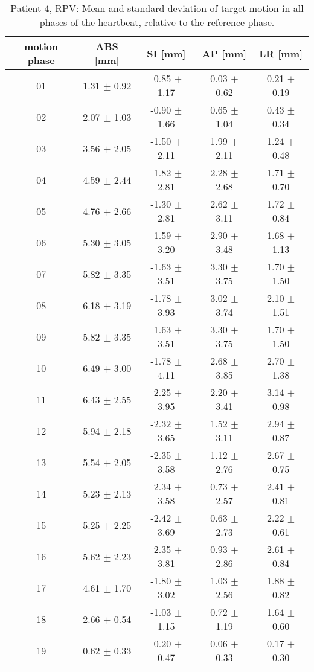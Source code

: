 \begin{table}[htbp]
  \centering
    \tiny
  \caption{Patient 4, RPV: Mean and standard deviation of target motion in all phases of the heartbeat, relative to the reference phase.}
  \begin{tabular}{|c|c|c|c|c|}
    \hline\hline
    motion phase\rule{0pt}{2.6ex}\rule[-1.2ex]{0pt}{0pt} & ABS [mm] & SI [mm] & AP [mm] & LR [mm]\\
    \hline
01& 1.31 $\pm$ 0.92& -0.85 $\pm$ 1.17& 0.03 $\pm$ 0.62& 0.21 $\pm$ 0.19 \\
02& 2.07 $\pm$ 1.03& -0.90 $\pm$ 1.66& 0.65 $\pm$ 1.04& 0.43 $\pm$ 0.34 \\
03& 3.56 $\pm$ 2.05& -1.50 $\pm$ 2.11& 1.99 $\pm$ 2.11& 1.24 $\pm$ 0.48 \\
04& 4.59 $\pm$ 2.44& -1.82 $\pm$ 2.81& 2.28 $\pm$ 2.68& 1.71 $\pm$ 0.70 \\
05& 4.76 $\pm$ 2.66& -1.30 $\pm$ 2.81& 2.62 $\pm$ 3.11& 1.72 $\pm$ 0.84 \\
06& 5.30 $\pm$ 3.05& -1.59 $\pm$ 3.20& 2.90 $\pm$ 3.48& 1.68 $\pm$ 1.13 \\
07& 5.82 $\pm$ 3.35& -1.63 $\pm$ 3.51& 3.30 $\pm$ 3.75& 1.70 $\pm$ 1.50 \\
08& 6.18 $\pm$ 3.19& -1.78 $\pm$ 3.93& 3.02 $\pm$ 3.74& 2.10 $\pm$ 1.51 \\
09& 5.82 $\pm$ 3.35& -1.63 $\pm$ 3.51& 3.30 $\pm$ 3.75& 1.70 $\pm$ 1.50 \\
10& 6.49 $\pm$ 3.00& -1.78 $\pm$ 4.11& 2.68 $\pm$ 3.85& 2.70 $\pm$ 1.38 \\
11& 6.43 $\pm$ 2.55& -2.25 $\pm$ 3.95& 2.20 $\pm$ 3.41& 3.14 $\pm$ 0.98 \\
12& 5.94 $\pm$ 2.18& -2.32 $\pm$ 3.65& 1.52 $\pm$ 3.11& 2.94 $\pm$ 0.87 \\
13& 5.54 $\pm$ 2.05& -2.35 $\pm$ 3.58& 1.12 $\pm$ 2.76& 2.67 $\pm$ 0.75 \\
14& 5.23 $\pm$ 2.13& -2.34 $\pm$ 3.58& 0.73 $\pm$ 2.57& 2.41 $\pm$ 0.81 \\
15& 5.25 $\pm$ 2.25& -2.42 $\pm$ 3.69& 0.63 $\pm$ 2.73& 2.22 $\pm$ 0.61 \\
16& 5.62 $\pm$ 2.23& -2.35 $\pm$ 3.81& 0.93 $\pm$ 2.86& 2.61 $\pm$ 0.84 \\
17& 4.61 $\pm$ 1.70& -1.80 $\pm$ 3.02& 1.03 $\pm$ 2.56& 1.88 $\pm$ 0.82 \\
18& 2.66 $\pm$ 0.54& -1.03 $\pm$ 1.15& 0.72 $\pm$ 1.19& 1.64 $\pm$ 0.60 \\
19& 0.62 $\pm$ 0.33& -0.20 $\pm$ 0.47& 0.06 $\pm$ 0.33& 0.17 $\pm$ 0.30 \\
    \hline\hline
  \end{tabular}
\end{table}


